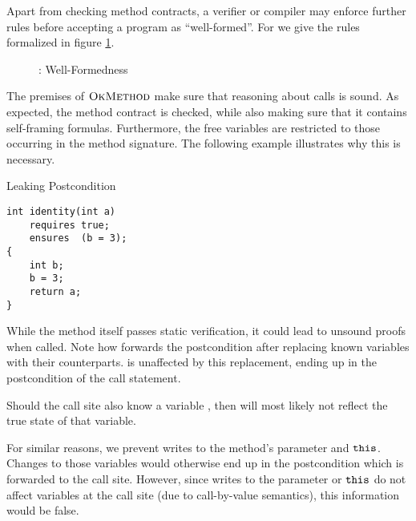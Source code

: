Apart from checking method contracts, a verifier or compiler may enforce further rules before accepting a program as “well-formed”.
For \svlidf we give the rules formalized in figure \ref{fig:idf-wf}.

\begin{figure}[h]
    
    \caption{\svlidf: Well-Formedness}
    \label{fig:idf-wf}
\end{figure}

The premises of $\textup{\textsc{OkMethod}}$ make sure that reasoning about calls is sound.
As expected, the method contract is checked, while also making sure that it contains self-framing formulas.
Furthermore, the free variables are restricted to those occurring in the method signature.
The following example illustrates why this is necessary.

\begin{example}{Leaking Postcondition}
\begin{lstlisting}
int identity(int a)
    requires true;
    ensures  (b = 3);
{
    int b;
    b = 3;
    return a;
}
\end{lstlisting}
While the method itself passes static verification, it could lead to unsound proofs when called.
Note how  forwards the postcondition after replacing known variables with their counterparts.
 is unaffected by this replacement, ending up in the postcondition of the call statement.

Should the call site also know a variable , then  will most likely not reflect the true state of that variable.
\end{example}

For similar reasons, we prevent writes to the method's parameter and $\textup{\texttt{this}}$.
Changes to those variables would otherwise end up in the postcondition which is forwarded to the call site.
However, since writes to the parameter or $\textup{\texttt{this}}$ do not affect variables at the call site (due to call-by-value semantics), this information would be false.
